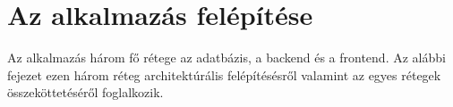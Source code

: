 \chapter{Az alkalmazás felépítése}

Az alkalmazás három fő rétege az adatbázis, a backend és a frontend. Az alábbi fejezet ezen három réteg architektúrális
felépítésésről valamint az egyes rétegek összeköttetéséről foglalkozik.








